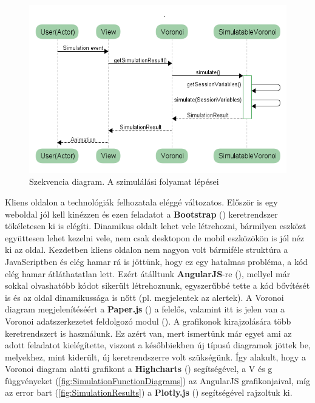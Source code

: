 \begin{figure}[ht!]
	\centering
	\includegraphics[width=\linewidth]{images/SimulationProcess}
	\caption{Szekvencia diagram. A szimulálási folyamat lépései}
	\label{fig:SimulationProcess}
\end{figure}


Kliens oldalon a technológiák felhozatala eléggé változatos. Először is egy weboldal jól kell kinézzen és ezen feladatot a \textbf{Bootstrap} (\cite{soft:bootstrap}) keretrendszer tökéletesen ki is elégíti. Dinamikus oldalt lehet vele létrehozni, bármilyen eszközt együttesen lehet kezelni vele, nem csak desktopon de mobil eszközökön is jól néz ki az oldal. Kezdetben kliens oldalon nem nagyon volt bármiféle struktúra a JavaScriptben és elég hamar rá is jöttünk, hogy ez egy hatalmas probléma, a kód elég hamar átláthatatlan lett. Ezért átálltunk \textbf{AngularJS}-re (\cite{soft:angular}), mellyel már sokkal olvashatóbb kódot sikerült létrehoznunk, egyszerűbbé tette a kód bővítését is és az oldal dinamikussága is nőtt (pl. megjelentek az alertek). A Voronoi diagram megjelenítéséért a \textbf{Paper.js} (\cite{soft:paper}) a felelős, valamint itt is jelen van a Voronoi adatszerkezetet feldolgozó modul (\cite{soft:voronoiModule}). A grafikonok kirajzolására több keretrendszert is használunk. Ez azért van, mert ismertünk már egyet ami az adott feladatot kielégítette, viszont a későbbiekben új típusú diagramok jöttek be, melyekhez, mint kiderült, új keretrendszerre volt szükségünk. Így alakult, hogy a Voronoi diagram alatti grafikont a \textbf{Highcharts} (\cite{soft:highcharts}) segítségével, a V és g függvényeket (\ref{fig:SimulationFunctionDiagrams}) az AngularJS grafikonjaival, míg az error bart (\ref{fig:SimulationResults}) a \textbf{Plotly.js} (\cite{soft:plotly}) segítségével rajzoltuk ki.

